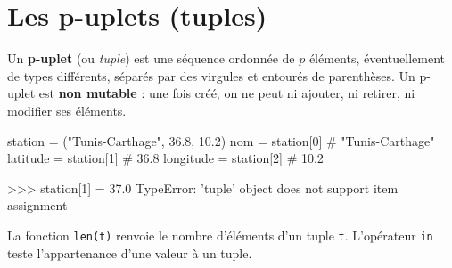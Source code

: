 \section{Les p-uplets (tuples)}
\label{sec:tuples}


\begin{nxdef}[D1]
  Un \textbf{p-uplet} (ou \emph{tuple}) est une séquence ordonnée de $p$ éléments, éventuellement
  de types différents, séparés par des virgules et entourés de parenthèses.
  Un p-uplet est \textbf{non mutable} : une fois créé, on ne peut ni ajouter, ni retirer,
  ni modifier ses éléments.
\end{nxdef}


\begin{python}
station = ("Tunis-Carthage", 36.8, 10.2)
nom = station[0]        # "Tunis-Carthage"
latitude = station[1]   # 36.8
longitude = station[2]  # 10.2
\end{python}



\begin{console}
>>> station[1] = 37.0
TypeError: 'tuple' object does not support item assignment
\end{console}


\begin{nxdef}[D2]
  La fonction \lstinline{len(t)} renvoie le nombre d'éléments d'un tuple \lstinline{t}.
  L'opérateur \lstinline{in} teste l'appartenance d'une valeur à un tuple.
\end{nxdef}

